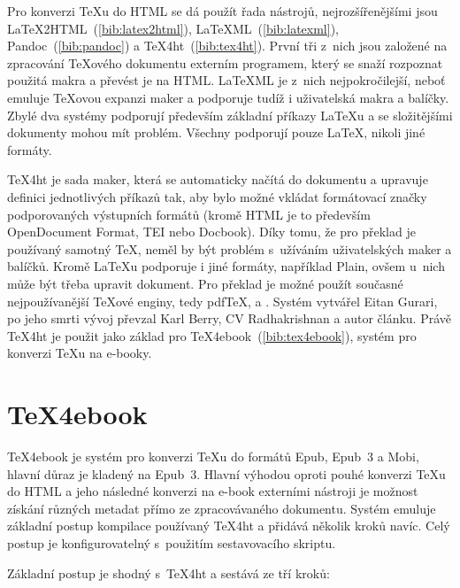 \documentclass{csbulletin}
\renewcommand\cite[1]{(\ref{#1})}
\begin{document}
Pro konverzi \TeX u do HTML se dá použít řada nástrojů, nejrozšířenějšími jsou
LaTeX2HTML~\cite{bib:latex2html},
LaTeXML~\cite{bib:latexml},
Pandoc~\cite{bib:pandoc} a
TeX4ht~\cite{bib:tex4ht}. První tři z~nich jsou založené na
zpracování \TeX ového dokumentu externím programem, který se snaží rozpoznat
použitá makra a převést je na HTML. LaTeXML je z~nich nejpokročilejší, neboť 
emuluje \TeX ovou expanzi maker a podporuje tudíž i uživatelská makra a
balíčky. Zbylé dva systémy podporují především základní příkazy \LaTeX u a se
složitějšími dokumenty mohou mít problém. Všechny podporují pouze \LaTeX,
nikoli jiné formáty. 

TeX4ht je sada maker, která se automaticky načítá do dokumentu a upravuje
definici jednotlivých příkazů tak, aby bylo možné vkládat formátovací značky
podporovaných výstupních formátů (kromě HTML je to především OpenDocument
Format, TEI nebo Docbook). Díky tomu, že pro překlad je používaný samotný \TeX,
neměl by být problém s~užíváním uživatelských maker a balíčků. Kromě \LaTeX u
podporuje i jiné formáty, například Plain, ovšem u~nich může být třeba upravit
dokument. Pro překlad je možné použít současné nejpoužívanější \TeX ové enginy,
tedy pdf\TeX, \XeTeX a \LuaTeX. Systém vytvářel Eitan Gurari, po jeho smrti
vývoj převzal Karl Berry, CV Radhakrishnan a autor článku. Právě TeX4ht je
použit jako základ pro TeX4ebook~\cite{bib:tex4ebook},
systém pro konverzi \TeX u na e-booky.

\section{TeX4ebook}

TeX4ebook je systém pro konverzi \TeX u do formátů Epub, Epub~3 a Mobi, hlavní
důraz je kladený na Epub~3. Hlavní výhodou oproti pouhé konverzi \TeX u do HTML
a jeho následné konverzi na e-book externími nástroji je možnost získání
různých metadat přímo ze zpracovávaného dokumentu. Systém emuluje základní
postup kompilace používaný TeX4ht a přidává několik kroků navíc. Celý postup je
konfigurovatelný s~použitím sestavovacího skriptu.

Základní postup je shodný s~TeX4ht a sestává ze tří kroků:
\end{document}
